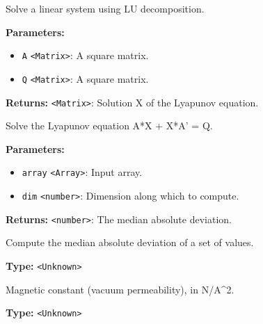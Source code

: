 \documentclass[12pt,a4paper]{article}
\begin{document}
\noindent Solve a linear system using LU decomposition.

\vspace{5mm}
\noindent {}


\noindent \textbf{Parameters:}
\begin{itemize}
  \item \texttt{A} \texttt{<Matrix>}: A square matrix.
  \item \texttt{Q} \texttt{<Matrix>}: A square matrix.
\end{itemize}

\noindent \textbf{Returns:} \texttt{<Matrix>}: Solution X of the Lyapunov equation.

\noindent Solve the Lyapunov equation A*X + X*A' = Q.

\vspace{5mm}
\noindent {}


\noindent \textbf{Parameters:}
\begin{itemize}
  \item \texttt{array} \texttt{<Array>}: Input array.
  \item \texttt{dim} \texttt{<number>}: Dimension along which to compute.
\end{itemize}

\noindent \textbf{Returns:} \texttt{<number>}: The median absolute deviation.

\noindent Compute the median absolute deviation of a set of values.

\vspace{5mm}
\noindent {}\vspace{4mm}


\noindent \textbf{Type:} \texttt{<Unknown>}

\noindent Magnetic constant (vacuum permeability), in N/A\textasciicircum{}2.

\vspace{5mm}
\noindent {}\vspace{4mm}


\noindent \textbf{Type:} \texttt{<Unknown>}
\end{document}
